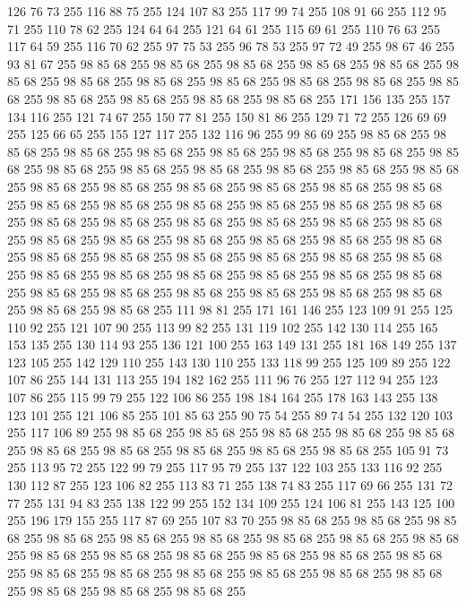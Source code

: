 126 76 73 255 116 88 75 255 124 107 83 255 117 99 74 255 108 91 66 255 112 95 71 255 110 78 62 255 124 64 64 255 121 64 61 255 115 69 61 255 110 76 63 255 117 64 59 255 116 70 62 255 97 75 53 255 96 78 53 255 97 72 49 255 98 67 46 255 93 81 67 255 98 85 68 255 98 85 68 255 98 85 68 255 98 85 68 255 98 85 68 255 98 85 68 255 98 85 68 255 98 85 68 255 98 85 68 255 98 85 68 255 98 85 68 255 98 85 68 255 98 85 68 255 98 85 68 255 98 85 68 255 98 85 68 255 171 156 135 255 157 134 116 255 121 74 67 255 150 77 81 255 150 81 86 255 129 71 72 255 126 69 69 255 125 66 65 255 155 127 117 255 132 116 96 255 99 86 69 255 98 85 68 255 98 85 68 255 98 85 68 255 98 85 68 255 98 85 68 255 98 85 68 255 98 85 68 255 98 85 68 255 98 85 68 255 98 85 68 255 98 85 68 255 98 85 68 255 98 85 68 255 98 85 68 255 98 85 68 255 98 85 68 255 98 85 68 255 98 85 68 255 98 85 68 255
98 85 68 255 98 85 68 255 98 85 68 255 98 85 68 255 98 85 68 255 98 85 68 255 98 85 68 255 98 85 68 255 98 85 68 255 98 85 68 255 98 85 68 255 98 85 68 255 98 85 68 255 98 85 68 255 98 85 68 255 98 85 68 255 98 85 68 255 98 85 68 255 98 85 68 255 98 85 68 255 98 85 68 255 98 85 68 255 98 85 68 255 98 85 68 255 98 85 68 255 98 85 68 255 98 85 68 255 98 85 68 255 98 85 68 255 98 85 68 255 98 85 68 255 98 85 68 255 98 85 68 255 98 85 68 255 98 85 68 255 98 85 68 255 98 85 68 255 98 85 68 255 98 85 68 255 111 98 81 255 171 161 146 255 123 109 91 255 125 110 92 255 121 107 90 255 113 99 82 255 131 119 102 255 142 130 114 255 165 153 135 255 130 114 93 255 136 121 100 255 163 149 131 255 181 168 149 255 137 123 105 255 142 129 110 255 143 130 110 255 133 118 99 255 125 109 89 255 122 107 86 255 144 131 113 255 194 182 162 255 111 96 76 255 127 112 94 255 123 107 86 255 115 99 79 255
122 106 86 255 198 184 164 255 178 163 143 255 138 123 101 255 121 106 85 255 101 85 63 255 90 75 54 255 89 74 54 255 132 120 103 255 117 106 89 255 98 85 68 255 98 85 68 255 98 85 68 255 98 85 68 255 98 85 68 255 98 85 68 255 98 85 68 255 98 85 68 255 98 85 68 255 98 85 68 255 105 91 73 255 113 95 72 255 122 99 79 255 117 95 79 255 137 122 103 255 133 116 92 255 130 112 87 255 123 106 82 255 113 83 71 255 138 74 83 255 117 69 66 255 131 72 77 255 131 94 83 255 138 122 99 255 152 134 109 255 124 106 81 255 143 125 100 255 196 179 155 255 117 87 69 255 107 83 70 255 98 85 68 255 98 85 68 255 98 85 68 255 98 85 68 255 98 85 68 255 98 85 68 255 98 85 68 255 98 85 68 255 98 85 68 255 98 85 68 255 98 85 68 255 98 85 68 255 98 85 68 255 98 85 68 255 98 85 68 255 98 85 68 255 98 85 68 255 98 85 68 255 98 85 68 255 98 85 68 255 98 85 68 255 98 85 68 255 98 85 68 255 98 85 68 255
